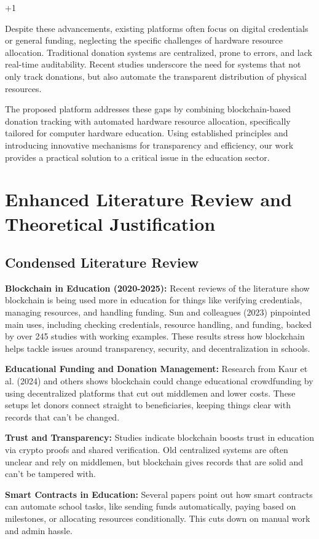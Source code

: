 +1\documentclass[conference]{IEEEtran}
\begin{document}
Despite these advancements, existing platforms often focus on digital credentials or general funding, neglecting the specific challenges of hardware resource allocation. Traditional donation systems are centralized, prone to errors, and lack real-time auditability. Recent studies underscore the need for systems that not only track donations, but also automate the transparent distribution of physical resources.

The proposed platform addresses these gaps by combining blockchain-based donation tracking with automated hardware resource allocation, specifically tailored for computer hardware education. Using established principles and introducing innovative mechanisms for transparency and efficiency, our work provides a practical solution to a critical issue in the education sector.

\section{Enhanced Literature Review and Theoretical Justification}
\subsection{Condensed Literature Review}
\textbf{Blockchain in Education (2020-2025):} Recent reviews of the literature show blockchain is being used more in education for things like verifying credentials, managing resources, and handling funding. Sun and colleagues (2023) pinpointed main uses, including checking credentials, resource handling, and funding, backed by over 245 studies with working examples. These results stress how blockchain helps tackle issues around transparency, security, and decentralization in schools.

\textbf{Educational Funding and Donation Management:} Research from Kaur et al. (2024) and others shows blockchain could change educational crowdfunding by using decentralized platforms that cut out middlemen and lower costs. These setups let donors connect straight to beneficiaries, keeping things clear with records that can't be changed.

\textbf{Trust and Transparency:} Studies indicate blockchain boosts trust in education via crypto proofs and shared verification. Old centralized systems are often unclear and rely on middlemen, but blockchain gives records that are solid and can't be tampered with.

\textbf{Smart Contracts in Education:} Several papers point out how smart contracts can automate school tasks, like sending funds automatically, paying based on milestones, or allocating resources conditionally. This cuts down on manual work and admin hassle.
\end{document}
